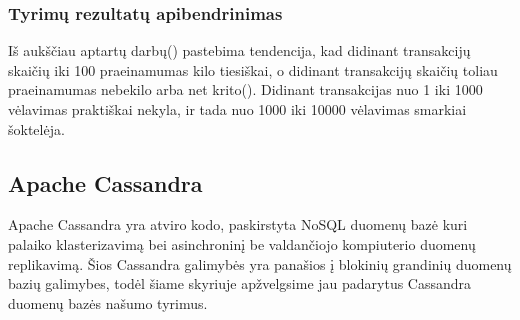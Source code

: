 \documentclass{VUMIFPSkursinis}
\begin{document}
\subsubsection{Tyrimų rezultatų apibendrinimas}
Iš aukščiau aptartų darbų(\cite{IMBResearch,ThailandPerf,ShaFabPerf}) pastebima tendencija, kad didinant transakcijų skaičių iki 100 praeinamumas kilo tiesiškai, o didinant transakcijų skaičių toliau praeinamumas nebekilo arba net krito(\cite{ThailandPerf}).
\newline
Didinant transakcijas nuo 1 iki 1000 vėlavimas praktiškai nekyla, ir tada nuo 1000 iki 10000 vėlavimas smarkiai šoktelėja. 
\subsection{Apache Cassandra}
Apache Cassandra yra atviro kodo, paskirstyta NoSQL duomenų bazė kuri palaiko klasterizavimą bei asinchroninį be valdančiojo kompiuterio duomenų replikavimą. Šios Cassandra galimybės yra panašios į blokinių grandinių duomenų bazių galimybes, todėl šiame skyriuje apžvelgsime jau padarytus 
Cassandra duomenų bazės našumo tyrimus. 
\end{document}
